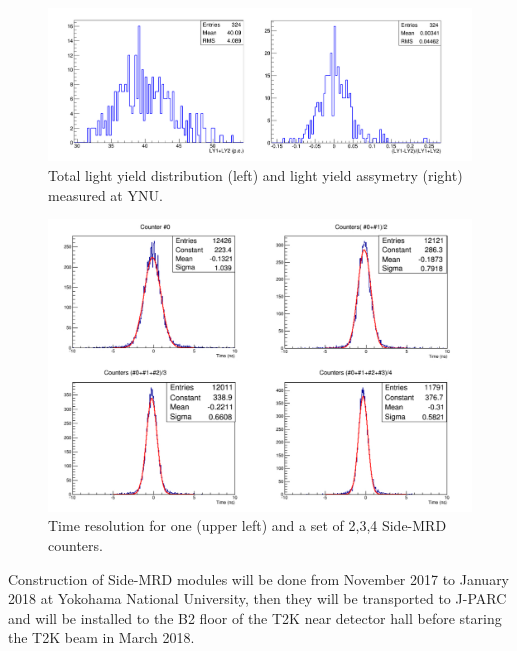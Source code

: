 \begin{figure}[tbh]
\begin{center}
\includegraphics[width=0.8\linewidth]{fig/side_mrd_ly.pdf}
\end{center}
\caption{
Total light yield distribution (left) and light yield assymetry (right) measured at YNU.
}
\label{fig:side_mrd_ly}
\end{figure}

\begin{figure}[tbh]
\begin{center}
\includegraphics[width=0.8\linewidth]{fig/side_mrd_combi_time.pdf}
\end{center}
\caption{
Time resolution for one (upper left) and a set of 2,3,4 Side-MRD counters.
}
\label{fig:side_mrd_combi_time}
\end{figure}
Construction of Side-MRD modules will be done from November 2017 to January 2018 at Yokohama National University, then they will be transported to J-PARC and will be installed to the B2 floor of the T2K near detector hall before staring the T2K beam in March 2018.

